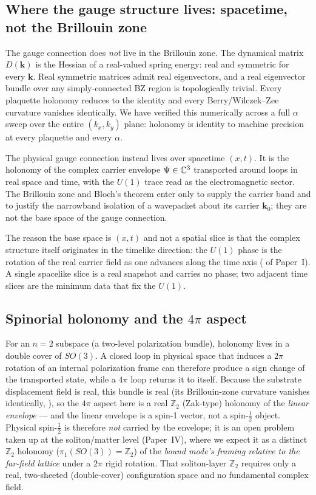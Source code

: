 \subsection{Where the gauge structure lives: spacetime, not the Brillouin zone}
\label{subsec:bz-gauge}

The gauge connection does \emph{not} live in the Brillouin zone.
The dynamical matrix $D(\mathbf{k})$ is the Hessian of a real-valued spring energy: real and symmetric
for every $\mathbf{k}$.
Real symmetric matrices admit real eigenvectors, and a real eigenvector bundle over any
simply-connected BZ region is topologically trivial.
Every plaquette holonomy reduces to the identity and every Berry/Wilczek--Zee curvature vanishes
identically.
We have verified this numerically across a full $\alpha$ sweep over the entire $(k_x,k_y)$ plane:
holonomy is identity to machine precision at every plaquette and every $\alpha$.

The physical gauge connection instead lives over spacetime $(x,t)$.
It is the holonomy of the complex carrier envelope $\Psi\in\mathbb{C}^3$ transported around loops in real
space and time, with the $U(1)$ trace read as the electromagnetic sector.
The Brillouin zone and Bloch's theorem enter only to supply the carrier band and to justify the
narrowband isolation of a wavepacket about its carrier $\mathbf{k}_0$; they are not the base space
of the gauge connection.

The reason the base space is $(x,t)$ and not a spatial slice is that the complex structure itself
originates in the timelike direction: the $U(1)$ phase is the rotation of the real carrier field as
one advances along the time axis ( of Paper~I).
A single spacelike slice is a real snapshot and carries no phase; two adjacent time slices are the
minimum data that fix the $U(1)$.

\subsection{Spinorial holonomy and the $4\pi$ aspect}
\label{subsec:spinorial-holonomy}

For an $n=2$ subspace (a two-level polarization bundle), holonomy lives in a double cover of $SO(3)$.
A closed loop in physical space that induces a $2\pi$ rotation of an internal polarization frame can
therefore produce a sign change of the transported state, while a $4\pi$ loop returns it to itself.
Because the substrate displacement field is real, this bundle is real (its Brillouin-zone curvature
vanishes identically, ), so the $4\pi$ aspect here is a real $\mathbb{Z}_2$
(Zak-type) holonomy of the \emph{linear envelope} --- and the linear envelope is a spin-1 vector, not a
spin-$\tfrac12$ object.
Physical spin-$\tfrac12$ is therefore \emph{not} carried by the envelope; it is an open problem taken up
at the soliton/matter level (Paper~IV), where we expect it as a distinct $\mathbb{Z}_2$ holonomy
($\pi_1(SO(3))=\mathbb{Z}_2$) of the \emph{bound mode's framing relative to the far-field lattice} under a
$2\pi$ rigid rotation. That soliton-layer $\mathbb{Z}_2$ requires only a real, two-sheeted (double-cover)
configuration space and no fundamental complex field.

